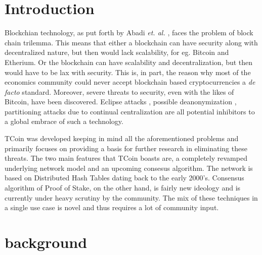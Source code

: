 \documentclass[conference,a4paper,12pt]{IEEEtran}
\begin{document}
\section{Introduction}
Blockchian technology, as put forth by Abadi \textit{et. al.} \cite{trilemma}, faces the problem of block chain trilemma. This means that either a blockchain can have security along with decentralized nature, but then would lack scalability, for eg. Bitcoin and Etherium. Or the blockchain can have scalability and decentralization, but then would have to be lax with security. This is, in part, the reason why most of the economics community could never accept blockchain based cryptocurrencies a \textit{de facto} standard. Moreover, severe threats to security, even with the likes of Bitcoin, have been discovered. Eclipse attacks \cite{eclipse}, possible deanonymization \cite{deanonymization_bitcoin}, partitioning attacks due to continual centralization \cite{partitioning} are all potential inhibitors to a global embrace of such a technology.
	
	TCoin was developed keeping in mind all the aforementioned problems and primarily focuses on providing a basis for further research in eliminating these threats. The two main features that TCoin boasts are, a completely revamped underlying network model and an upcoming consesus algorithm. The network is based on Distributed Hash Tables \cite{dht} dating back to the early 2000's. Consensus algorithm of Proof of Stake, on the other hand, is fairly new ideology and is currently under heavy scrutiny by the community. The mix of these techniques in a single use case is novel and thus requires a lot of community input.

\section{background}
\end{document}
